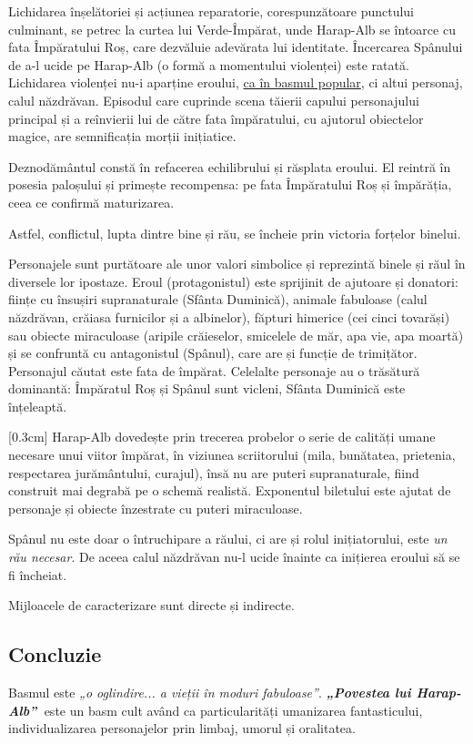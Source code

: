 \documentclass[
12pt,
a4paper
]{article}
\newcommand{\operatitle}{\textbf{\textit{„Povestea lui Harap-Alb”\ }}} %
\begin{document}
Lichidarea înșelătoriei și acțiunea reparatorie, corespunzătoare punctului culminant, se petrec la curtea lui Verde-Împărat, unde Harap-Alb se întoarce cu fata Împăratului Roș, care dezvăluie adevărata lui identitate. Încercarea Spânului de a-l ucide pe Harap-Alb (o formă a momentului violenței) este ratată. Lichidarea violenței nu-i aparține eroului, \underline{ca în basmul popular}, ci altui personaj, calul năzdrăvan. Episodul care cuprinde scena tăierii capului personajului principal și a reînvierii lui de către fata împăratului, cu ajutorul obiectelor magice, are semnificația morții inițiatice.

Deznodământul constă în refacerea echilibrului și răsplata eroului. El reintră în posesia paloșului și primește recompensa: pe fata Împăratului Roș și împărăția, ceea ce confirmă maturizarea.

Astfel, conflictul, lupta dintre bine și rău, se încheie prin victoria forțelor binelui.

Personajele sunt purtătoare ale unor valori simbolice și reprezintă binele și răul în diversele lor ipostaze. Eroul (protagonistul) este sprijinit de ajutoare și donatori: ființe cu însușiri supranaturale (Sfânta Duminică), animale fabuloase (calul năzdrăvan, crăiasa furnicilor și a albinelor), făpturi himerice (cei cinci tovarăși) sau obiecte miraculoase (aripile crăieselor, smicelele de măr, apa vie, apa moartă) și se confruntă cu antagonistul (Spânul), care are și funcție de trimițător. Personajul căutat este fata de împărat. Celelalte personaje au o trăsătură dominantă: Împăratul Roș și Spânul sunt vicleni, Sfânta Duminică este înțeleaptă.

[0.3cm]
Harap-Alb dovedește prin trecerea probelor o serie de calități umane necesare unui viitor împărat, în viziunea scriitorului (mila, bunătatea, prietenia, respectarea jurământului, curajul), însă nu are puteri supranaturale, fiind construit mai degrabă pe o schemă realistă. Exponentul biletului este ajutat de personaje și obiecte înzestrate cu puteri miraculoase.

Spânul nu este doar o întruchipare a răului, ci are și rolul inițiatorului, este \textit{un rău necesar}. De aceea calul năzdrăvan nu-l ucide înainte ca inițierea eroului să se fi încheiat.

Mijloacele de caracterizare sunt directe și indirecte.


\subsection{Concluzie}

Basmul este \textit{„o oglindire... a vieții în moduri fabuloase”}. \operatitle este un basm cult având ca particularități umanizarea fantasticului, individualizarea personajelor prin limbaj, umorul și oralitatea.
\end{document}
